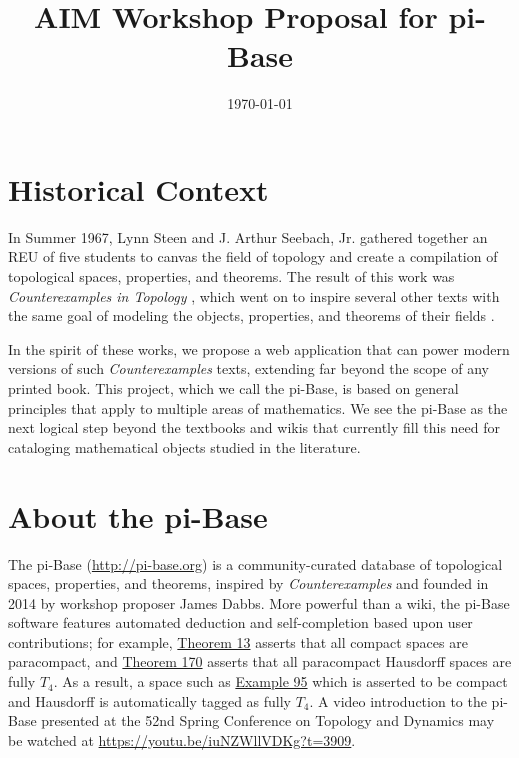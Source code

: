 \documentclass{amsart}
\title{AIM Workshop Proposal for pi-Base}
\date{\today}
\begin{document}
\maketitle


\section{Historical Context}

In Summer 1967, Lynn Steen and J. Arthur Seebach, Jr. gathered together
an REU of five students to canvas the field of topology and create
a compilation of topological spaces, properties, and theorems.
The result of this work was \textit{Counterexamples in Topology} 
\cite{MR1382863}, which went on to inspire several other texts
with the same goal of modeling the objects, properties, and theorems of
their fields \cite{MR0491272,MR1113487,MR930671,MR1256489}.

In the spirit of these works,
we propose a web application that can power modern versions
of such \textit{Counterexamples} texts, extending far beyond the scope
of any printed book. This project, which we call the pi-Base, is based 
on general principles that apply to multiple areas of mathematics.
We see the pi-Base as the next logical step beyond the textbooks
and wikis that currently fill this need for cataloging mathematical
objects studied in the literature.

\section{About the pi-Base}

The pi-Base (\url{http://pi-base.org}) is a community-curated
database of topological spaces, properties, and theorems, 
inspired by \textit{Counterexamples} and founded in 2014 by
workshop proposer James Dabbs. More
powerful than a wiki, the pi-Base software features automated
deduction and self-completion based upon user contributions;
for example,
\href{https://topology.pi-base.org/theorems/I000013}{Theorem 13}
asserts that all compact spaces are paracompact,
and
\href{https://topology.pi-base.org/theorems/I000170}{Theorem 170}
asserts that all paracompact Hausdorff spaces are fully \(T_4\).
As a result, a space such as
\href{https://topology.pi-base.org/spaces/S000095}{Example 95}
which is asserted to be compact and Hausdorff is automatically tagged
as fully \(T_4\). A video introduction to the pi-Base presented at the
52nd Spring Conference on Topology and Dynamics may be
watched at \url{https://youtu.be/iuNZWllVDKg?t=3909}.
\end{document}
